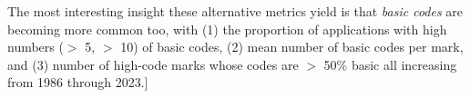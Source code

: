 \documentclass[letterpaper, 11pt, oneside]{article}
\begin{document}
The most interesting insight these alternative metrics yield is that \emph{basic codes} are becoming more common too, with (1) the proportion of applications with high numbers ($>$ 5, $>$ 10) of basic codes, (2) mean number of basic codes per mark, and (3) number of high-code marks whose codes are $>$ 50\% basic all increasing from 1986 through 2023.]



\end{document}
